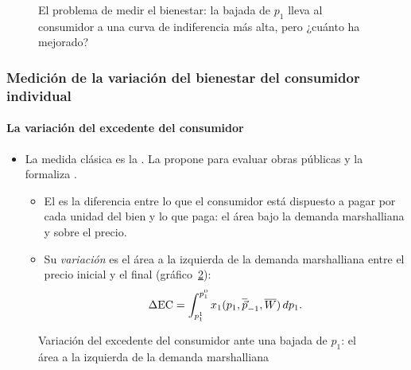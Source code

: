 \documentclass[11pt]{article}
\begin{document}
\begin{figure}[H]
\centering
\caption{El problema de medir el bienestar: la bajada de $p_1$ lleva al consumidor a una curva de indiferencia más alta, pero ¿cuánto ha mejorado?}\label{fig:bienestar-problema}
\end{figure}

\subsubsection{Medición de la variación del bienestar del consumidor individual}\label{sec:medicion-variacion-bienestar}

\paragraph{La variación del excedente del consumidor}

\begin{itemize}
\item La medida clásica es la . La propone \textcite{Dupuit1844Mesure} para evaluar obras públicas y la formaliza \textcite{Marshall1890Principles}.
  \begin{itemize}
  \item El  es la diferencia entre lo que el consumidor está dispuesto a pagar por cada unidad del bien y lo que paga: el área bajo la demanda marshalliana y sobre el precio.
  \item Su \emph{variación} es el área a la izquierda de la demanda marshalliana entre el precio inicial y el final (gráfico~\ref{fig:bienestar-delta-ec}):
    \begin{equation}
    \Delta\mathrm{EC}=\int_{p_1^1}^{p_1^0}x_1(p_1,\overline{\vec{p}}_{-1},\overline{W})\,dp_1. \label{eq:delta-ec}
    \end{equation}
  \end{itemize}
\end{itemize}

\begin{figure}[H]
\centering
\caption{Variación del excedente del consumidor ante una bajada de $p_1$: el área a la izquierda de la demanda marshalliana}\label{fig:bienestar-delta-ec}
\end{figure}
\end{document}
